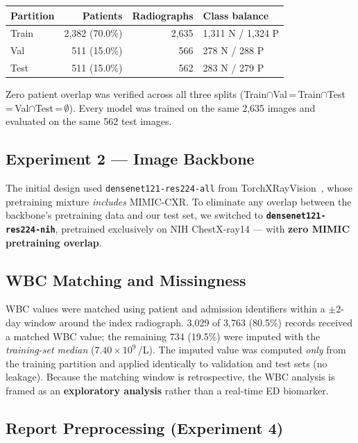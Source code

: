\documentclass{article}
\begin{document}
\begin{center}
\small
\begin{tabular}{lrrl}
\toprule
Partition & Patients & Radiographs & Class balance \\
\midrule
Train & 2,382 (70.0\%) & 2,635 & 1,311 N / 1,324 P \\
Val   &   511 (15.0\%) &   566 &   278 N / 288 P \\
Test  &   511 (15.0\%) &   562 &   283 N / 279 P \\
\bottomrule
\end{tabular}
\end{center}
\noindent Zero patient overlap was verified across all three splits
(Train$\cap$Val\,=\,Train$\cap$Test\,=\,Val$\cap$Test\,=\,$\emptyset$).
Every model was trained on the same 2,635 images and evaluated on the
same 562 test images.

\subsection{Experiment 2 — Image Backbone}

The initial design used \texttt{densenet121-res224-all} from
TorchXRayVision~\cite{cohen2022torchxrayvision}, whose pretraining mixture
\emph{includes} MIMIC-CXR.
To eliminate any overlap between the backbone's pretraining data and our
test set, we switched to \textbf{\texttt{densenet121-res224-nih}}, pretrained
exclusively on NIH ChestX-ray14 — with \textbf{zero MIMIC pretraining
overlap}.

\subsection{WBC Matching and Missingness}

WBC values were matched using patient and admission identifiers within a
$\pm$2-day window around the index radiograph.
3,029 of 3,763 (80.5\%) records received a matched WBC value;
the remaining 734 (19.5\%) were imputed with the \emph{training-set median}
($7.40\times10^{9}$\,/L).
The imputed value was computed \emph{only} from the training partition and
applied identically to validation and test sets (no leakage).
Because the matching window is retrospective, the WBC analysis is framed
as an \textbf{exploratory analysis} rather than a real-time ED biomarker.

\subsection{Report Preprocessing (Experiment 4)}
\end{document}
